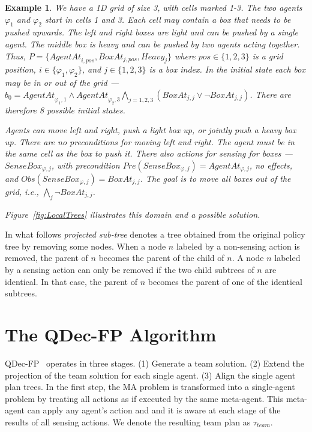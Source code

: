 \documentclass[letterpaper]{article}
\newtheorem{example}{Example}
\theoremstyle{definition}
\begin{document}
\begin{example}
\label{ex:BoxPushing}
We have a 1D grid of size 3, with cells marked 1-3. The two agents $\varphi_1$ and $\varphi_2$ start in cells 1 and 3. Each cell may contain a box that needs to be pushed upwards. The left and right boxes are light and can be pushed
by a single agent. The middle box is heavy and can
be pushed by two agents acting together. Thus,
$P=\{\mathit{AgentAt}_{i,pos},\mathit{BoxAt}_{j,pos},\mathit{Heavy}_{j}\}$ where $pos \in \{1,2,3\}$ is a grid position, $i \in \{\varphi_1,\varphi_2\}$, and $j \in \{1,2,3\}$ is a box index. In the initial state each box may be in or out of the grid --- $b_0=\mathit{AgentAt}_{\varphi_1,1} \wedge \mathit{AgentAt}_{\varphi_2,3} \bigwedge_{j=1,2,3} (BoxAt_{j,j} \vee \neg BoxAt_{j,j})$. There are therefore 8 possible initial states.

Agents can move left and right, push a light box up, or jointly push a heavy box up. There are no preconditions for moving left and right. The agent must be
in the same cell as the box to push it.
There also actions for sensing for boxes --- $\mathit{SenseBox_{\varphi,j}}$, with precondition $\mathit{Pre(SenseBox_{\varphi,j})}=AgentAt_{\varphi,j}$, no effects, and $\mathit{Obs(SenseBox_{\varphi,j})}=BoxAt_{j,j}$.
The goal is to move all boxes out of the grid, i.e., $\bigwedge_j \neg BoxAt_{j,j}$.

Figure~\ref{fig:LocalTrees} illustrates this domain and a possible solution.
\end{example}

In what follows  {\em projected sub-tree} denotes a tree  obtained from the original policy tree by removing some nodes. When a node $n$ labeled by a non-sensing action is removed, the parent of $n$ becomes the parent of the child of $n$. A node $n$ labeled by a sensing action can only be removed if the two child subtrees of $n$ are identical. In that case, the parent of $n$ becomes the parent of one of the identical subtrees.





\section{The QDec-FP Algorithm}

QDec-FP~\citep{ShekharBS19} operates in three stages. (1) Generate a team solution. (2) Extend the projection of the team solution for each single agent. (3) Align the single agent plan trees.
In the first step, the MA problem is transformed into a single-agent problem by treating all actions as if executed by the same meta-agent. This meta-agent can apply any agent's action and and it is aware at each stage of the results of all sensing actions. We denote the resulting team plan as $\tau_{team}$.
\end{document}
